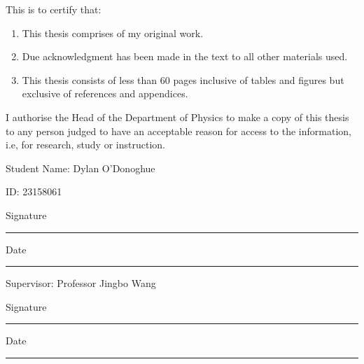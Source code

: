 This is to certify that:

\begin{enumerate}

    \item This thesis comprises of my original work.

    \item  Due acknowledgment has been made in the text to all other materials used.

    \item This thesis consists of less than 60 pages inclusive of tables and figures but exclusive of references and appendices.
\end{enumerate}

I authorise the Head of the Department of Physics to make a copy of this thesis to any person judged to have an acceptable reason for access to the information, i.e, for research, study or instruction.

\vspace{10mm}
Student Name: Dylan O'Donoghue

ID: 23158061

\vspace{5mm}
Signature
\vspace{4mm}
\hrule

\vspace{5mm}
Date
\vspace{4mm}
\hrule

\vspace{10mm}
Supervisor: Professor Jingbo Wang

\vspace{5mm}
Signature
\vspace{4mm}
\hrule

\vspace{5mm}
Date
\vspace{4mm}
\hrule

